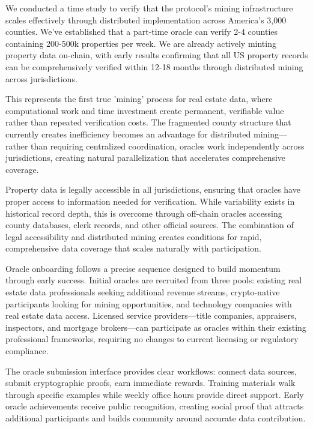 We conducted a time study to verify that the protocol's mining infrastructure scales effectively through distributed implementation across America's 3,000 counties. We've established that a part-time oracle can verify 2-4 counties containing 200-500k properties per week. We are already actively minting property data on-chain, with early results confirming that all US property records can be comprehensively verified within 12-18 months through distributed mining across jurisdictions.

This represents the first true 'mining' process for real estate data, where computational work and time investment create permanent, verifiable value rather than repeated verification costs. The fragmented county structure that currently creates inefficiency becomes an advantage for distributed mining---rather than requiring centralized coordination, oracles work independently across jurisdictions, creating natural parallelization that accelerates comprehensive coverage.

Property data is legally accessible in all jurisdictions, ensuring that oracles have proper access to information needed for verification. While variability exists in historical record depth, this is overcome through off-chain oracles accessing county databases, clerk records, and other official sources. The combination of legal accessibility and distributed mining creates conditions for rapid, comprehensive data coverage that scales naturally with participation.

Oracle onboarding follows a precise sequence designed to build momentum through early success. Initial oracles are recruited from three pools: existing real estate data professionals seeking additional revenue streams, crypto-native participants looking for mining opportunities, and technology companies with real estate data access. Licensed service providers---title companies, appraisers, inspectors, and mortgage brokers---can participate as oracles within their existing professional frameworks, requiring no changes to current licensing or regulatory compliance.

The oracle submission interface provides clear workflows: connect data sources, submit cryptographic proofs, earn immediate rewards. Training materials walk through specific examples while weekly office hours provide direct support. Early oracle achievements receive public recognition, creating social proof that attracts additional participants and builds community around accurate data contribution.

